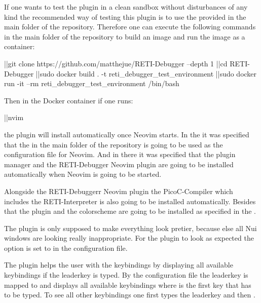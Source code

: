 \documentclass{report}
\begin{document}
If one wants to test the plugin in a clean sandbox without disturbances of any kind the recommended way of testing this plugin is to use the provided  in the main folder of the repository. Therefore one can execute the following commands in the main folder of the repository to build an \alert{image} and run the image as a \alert{container}:

\begin{terminal}
	|\prompt|git clone https://github.com/matthejue/RETI-Debugger --depth 1
	|\prompt|cd RETI-Debugger
	|\prompt|sudo docker build . -t reti_debugger_test_environment
	|\prompt|sudo docker run -it --rm reti_debugger_test_environment /bin/bash
\end{terminal}

Then in the Docker container if one runs:

\begin{terminal}
	|\prompt|nvim
\end{terminal}

the plugin will install automatically once Neovim starts. In the  it was specified that the  in the main folder of the repository is going to be used as the configuration file  for Neovim. And in there it was specified that the \alert{plugin manager}  and the RETI-Debugger Neovim plugin are going to be installed automatically when Neovim is going to be started.

Alongside the RETI-Debuggerr Neovim plugin the PicoC-Compiler which includes the \alert{RETI-Interpreter} is also going to be installed automatically. Besides that the  plugin and the colorscheme  are going to be installed as specified in the .

The  plugin is only supposed to make everything look pretier, because else all \alert{Nui} windows are looking really inappropriate. For the  plugin to look as expected the option  is set to  in the configuration file.

The  plugin helps the user with the keybindings by displaying all available keybindings if the \alert{leaderkey} is typed. By the configuration file  the leaderkey is mapped to  and displays all available keybindings where  is the first key that has to be typed. To see all other keybindings one first types the leaderkey  and then \inlinebox{$\leftarrow$}.
\end{document}
